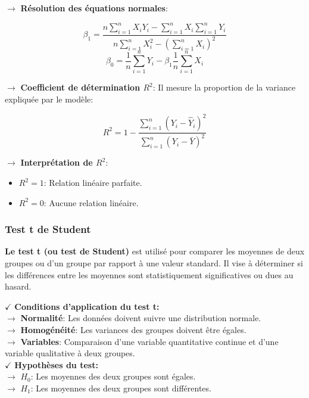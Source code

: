 \noindent \textbf{\(\rightarrow\)}  \textbf{Résolution des équations normales}:

\[
\beta_1 = \frac{n \sum_{i=1}^{n} X_i Y_i - \sum_{i=1}^{n} X_i \sum_{i=1}^{n} Y_i}{n \sum_{i=1}^{n} X_i^2 - \left( \sum_{i=1}^{n} X_i \right)^2}
\]
\[
\beta_0 = \frac{1}{n} \sum_{i=1}^{n} Y_i - \beta_1 \frac{1}{n} \sum_{i=1}^{n} X_i
\]

\noindent \textbf{\(\rightarrow\)}  \textbf{Coefficient de détermination \( R^2 \)}: Il mesure la proportion de la variance expliquée par le modèle:

\[
R^2 = 1 - \frac{\sum_{i=1}^{n} (Y_i - \hat{Y}_i)^2}{\sum_{i=1}^{n} (Y_i - \bar{Y})^2}
\]

\noindent \textbf{\(\rightarrow\)} \textbf{Interprétation de \( R^2 \)}:
\begin{itemize}
    \item \( R^2 = 1 \): Relation linéaire parfaite.
    \item \( R^2 = 0 \): Aucune relation linéaire.
\end{itemize}


\subsubsection{Test t de Student}

\textbf{Le test t (ou test de Student)} \cite{t} est utilisé pour comparer les moyennes de deux groupes ou d'un groupe par rapport à une valeur standard. Il vise à déterminer si les différences entre les moyennes sont statistiquement significatives ou dues au hasard.

\textbf{\(\checkmark\)} \textbf{Conditions d'application du test t:}\\
    \textbf{\(\rightarrow\)} \textbf{Normalité}: Les données doivent suivre une distribution normale.\\
    \textbf{\(\rightarrow\)} \textbf{Homogénéité}: Les variances des groupes doivent être égales.\\
    \textbf{\(\rightarrow\)} \textbf{Variables}: Comparaison d'une variable quantitative continue et d'une variable qualitative à deux groupes.\\
\textbf{\(\checkmark\)} \textbf{Hypothèses du test:}\\
    \textbf{\(\rightarrow\)} \( H_0 \): Les moyennes des deux groupes sont égales.\\
    \textbf{\(\rightarrow\)} \( H_1 \): Les moyennes des deux groupes sont différentes.\\


